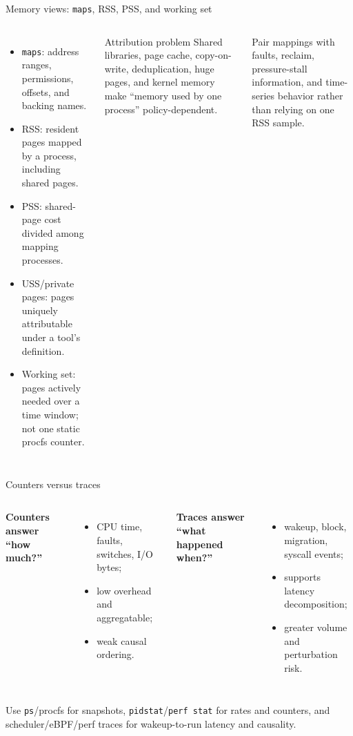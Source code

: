 \documentclass[aspectratio=169,11pt]{beamer}
\newcommand{\code}[1]{\texttt{#1}}
\begin{document}
\begin{frame}{Memory views: \code{maps}, RSS, PSS, and working set}
  \begin{columns}[T,onlytextwidth]
      \begin{itemize}
        \item \code{maps}: address ranges, permissions, offsets, and backing names.
        \item RSS: resident pages mapped by a process, including shared pages.
        \item PSS: shared-page cost divided among mapping processes.
        \item USS/private pages: pages uniquely attributable under a tool's definition.
        \item Working set: pages actively needed over a time window; not one static procfs counter.
      \end{itemize}
      \begin{alertblock}{Attribution problem}
        Shared libraries, page cache, copy-on-write, deduplication, huge pages, and kernel memory make ``memory used by one process'' policy-dependent.
      \end{alertblock}
      \begin{tcolorbox}[title=Diagnosis]
        Pair mappings with faults, reclaim, pressure-stall information, and time-series behavior rather than relying on one RSS sample.
      \end{tcolorbox}
  \end{columns}
\end{frame}

\begin{frame}{Counters versus traces}
  \begin{columns}[T,onlytextwidth]
      \textbf{Counters answer ``how much?''}
      \begin{itemize}
        \item CPU time, faults, switches, I/O bytes;
        \item low overhead and aggregatable;
        \item weak causal ordering.
      \end{itemize}
      \textbf{Traces answer ``what happened when?''}
      \begin{itemize}
        \item wakeup, block, migration, syscall events;
        \item supports latency decomposition;
        \item greater volume and perturbation risk.
      \end{itemize}
  \end{columns}
  \begin{tcolorbox}[title=Tool matching]
    Use \code{ps}/procfs for snapshots, \code{pidstat}/\code{perf stat} for rates and counters, and scheduler/eBPF/perf traces for wakeup-to-run latency and causality.
  \end{tcolorbox}
\end{frame}
\end{document}
